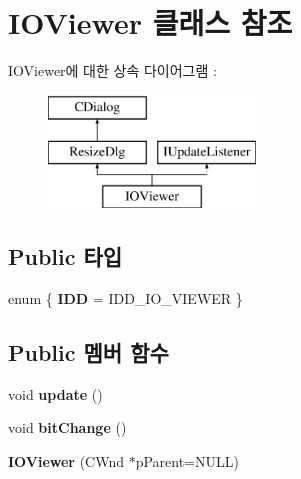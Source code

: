 \hypertarget{class_i_o_viewer}{}\section{I\+O\+Viewer 클래스 참조}
\label{class_i_o_viewer}
I\+O\+Viewer에 대한 상속 다이어그램 \+: \begin{figure}[H]
\begin{center}
\leavevmode
\includegraphics[height=3.000000cm]{class_i_o_viewer}
\end{center}
\end{figure}
\subsection*{Public 타입}
\begin{DoxyCompactItemize}
\item 
\mbox{\label{class_i_o_viewer_ae3a0a931b85052266f471555982f4467}} 
enum \{ {\bfseries I\+DD} = I\+D\+D\+\_\+\+I\+O\+\_\+\+V\+I\+E\+W\+ER
 \}
\end{DoxyCompactItemize}
\subsection*{Public 멤버 함수}
\begin{DoxyCompactItemize}
\item 
\mbox{\label{class_i_o_viewer_a500c8fc593280ff95977fb59293b6ab6}} 
void {\bfseries update} ()
\item 
\mbox{\label{class_i_o_viewer_af0c313447ad43d835f1eeca938bfd759}} 
void {\bfseries bit\+Change} ()
\item 
\mbox{\label{class_i_o_viewer_a0a407ba2dca2ad056507e2ed888d6fc3}} 
{\bfseries I\+O\+Viewer} (C\+Wnd $\ast$p\+Parent=N\+U\+LL)
\end{DoxyCompactItemize}
